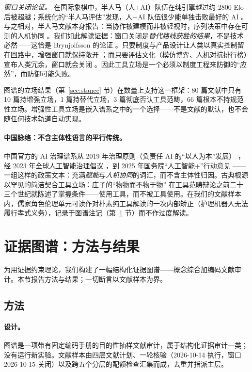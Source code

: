 \documentclass[10pt,fontset=fandol]{ctexart}
\begin{document}
\emph{窗口关闭论证。} 在国际象棋中，半人马（人+AI）队伍在纯引擎越过约 2800 Elo 后被超越；系统化的“半人马评估”发现，人+AI 队伍很少能单独击败最好的 AI \cite{haupt2025imitation}。与之相对，半人马文献本身报告：当协作被建模而非被轻视时，序列决策中存在可测的人机协同 \cite{shoresh2024modeling}。我们如此解读证据：窗口关闭是\emph{替代路线获胜的结果}，不是技术必然——这恰是 Brynjolfsson 的论证 \cite{brynjolfsson2022turing}。只要制度与产品设计让人类以真实控制留在回路中，增强窗口就保持敞开 \cite{shneiderman2022human}；而只要评估文化（模仿博弈、人机对抗排行榜）宣布人类冗余，窗口就会关闭 \cite{haupt2025imitation}。因此工具立场是一个必须以制度工程来防御的“应然”，而防御可能失败。

图谱的立场结果（第~\ref{sec:stance} 节）在数量上支持这一框架：80 篇文献中只有 10 篇持增强立场，1 篇持替代立场，3 篇彻底否认工具范畴，66 篇根本不持规范性立场。增强性工具立场是嵌入谱系之中的一个选择——不是文献的默认，也不会随任何技术轨道自动实现。

\paragraph{中国脉络：不含主体性语言的平行传统。}
中国官方的 AI 治理谱系从 2019 年治理原则（负责任 AI 的“以人为本”发展） \cite{govcn2019principles}，经 2023 年全球人工智能治理倡议 \cite{govcn2023initiative}，到 2025 年国务院“人工智能+”行动意见 \cite{govcn2025aiplus}——一组这样的政策文本：充满\emph{赋能}与\emph{人机协同}的词汇，而不含主体性归因。古典根源以罕见的简洁契合工具立场：庄子的“物物而不物于物” \cite{zhuangzi2016complete} 在工具范畴辩论之前二十三个世纪就陈述了掌握条件——使用工具，而不被工具使用。在我们的文献样本内，儒家角色伦理单元可读作对朴素纯工具解读的一次内部矫正（护理机器人无法履行孝式义务），记录于图谱注记（第~\ref{sec:evidencemap} 节）而不作过度解读。

\section{证据图谱：方法与结果}\label{sec:evidencemap}

为用证据约束理论，我们构建了一幅结构化证据图谱——概念综合加编码文献审计。本节报告方法与结果；一切断言以文献样本为界。

\subsection{方法}\label{sec:method}

\paragraph{设计。}
图谱是一项带有固定编码手册的目的性抽样文献审计，属于结构化证据审计一类；没有运行新实验。文献样本由四层文献计划、一轮核验（2026-10-14 执行，窗口 2026-10-15 关闭）以及跨五个分层的配额检查汇集而成，去重并指派主层。
\end{document}
